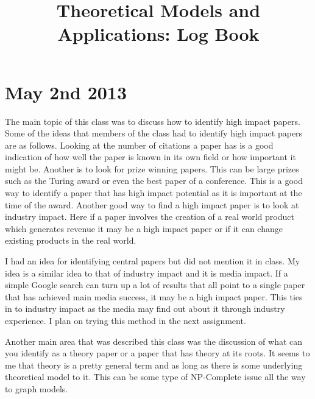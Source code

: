 \documentclass[conference]{IEEEtran}
\begin{document}
\title{Theoretical Models and Applications: Log Book}

\author{
}

\maketitle

\section{May 2nd 2013}

The main topic of this class was to discuss how to identify high impact papers. Some of
the ideas that members of the class had to identify high impact papers are as follows.
Looking at the number of citations a paper has is a good indication of how well the paper
is known in its own field or how important it might be. Another is to look for prize winning
papers. This can be large prizes such as the Turing award or even the best paper of a conference.
This is a good way to identify a paper that has high impact potential as it is important at
the time of the award. Another good way to find a high impact paper is to look at industry impact.
Here if a paper involves the creation of a real world product which generates revenue it
may be a high impact paper or if it can change existing products in the real world.

I had an idea for identifying central papers but did not mention it in class. My idea is a 
similar idea to that of industry impact and it is media impact. If a simple Google search
can turn up a lot of results that all point to a single paper that has achieved main media 
success, it may be a high impact paper. This ties in to industry impact as the media 
may find out about it through industry experience. I plan on trying this method in the 
next assignment.

Another main area that was described this class was the discussion of what can you identify
as a theory paper or a paper that has theory at its roots. It seems to me that theory is a
pretty general term and as long as there is some underlying theoretical model to it. This
can be some type of NP-Complete issue all the way to graph models.
\end{document}
